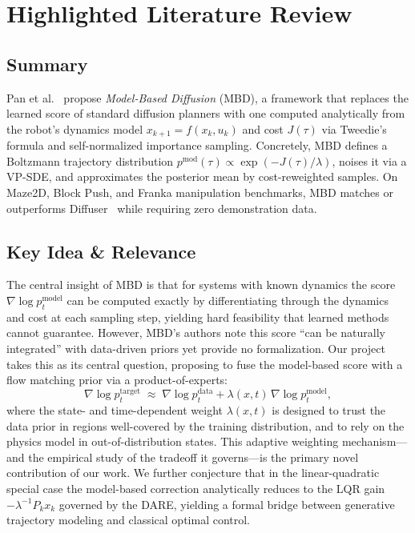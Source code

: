 \documentclass[conference]{IEEEtran}
\begin{document}
\section{Highlighted Literature Review}

\subsection{Summary}

Pan et al.~\cite{mbd} propose \emph{Model-Based Diffusion}
(MBD), a framework that replaces the learned score of standard
diffusion planners with one computed analytically from the robot's
dynamics model $x_{k+1}=f(x_k,u_k)$ and cost $J(\tau)$ via Tweedie's
formula and self-normalized importance sampling.
Concretely, MBD defines a Boltzmann trajectory distribution
$p^{\mathrm{mod}}(\tau)\propto\exp(-J(\tau)/\lambda)$, noises it via a
VP-SDE, and approximates the posterior mean by cost-reweighted samples.
On Maze2D, Block Push, and Franka manipulation benchmarks, MBD matches
or outperforms Diffuser~\cite{janner2022} while requiring zero
demonstration data.

\subsection{Key Idea \& Relevance}

The central insight of MBD is that for systems with known dynamics the
score $\nabla \log p^{\mathrm{model}}_t$ can be computed exactly by
differentiating through the dynamics and cost at each sampling step,
yielding hard feasibility that learned methods cannot guarantee.
However, MBD's authors note this score ``can be naturally integrated''
with data-driven priors yet provide no formalization.
Our project takes this as its central question, proposing to fuse the
model-based score with a flow matching prior via a product-of-experts:
\begin{equation}
  \nabla \log p^{\mathrm{target}}_t \;\approx\;
  \nabla \log p^{\mathrm{data}}_t
  + \lambda(x, t)\,\nabla \log p^{\mathrm{model}}_t,
\end{equation}
where the state- and time-dependent weight $\lambda(x,t)$ is designed
to trust the data prior in regions well-covered by the training
distribution, and to rely on the physics model in out-of-distribution
states.
This adaptive weighting mechanism---and the empirical study of the
tradeoff it governs---is the primary novel contribution of our work.
We further conjecture that in the linear-quadratic special case the
model-based correction analytically reduces to the LQR gain
$-\lambda^{-1}P_k x_k$ governed by the DARE, yielding a formal bridge
between generative trajectory modeling and classical optimal control.
\end{document}
